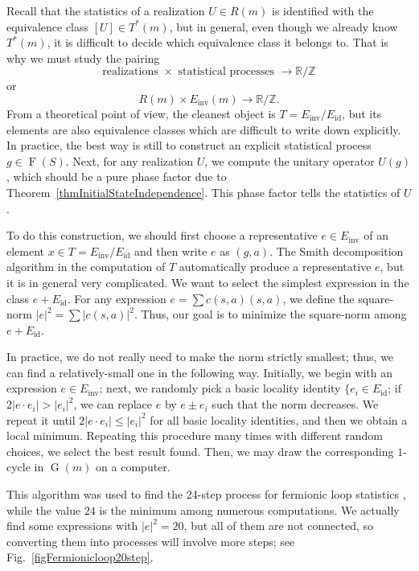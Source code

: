 \documentclass[reprint, amsmath, amssymb, showpacs, floatfix, longbibliography, aps, twocolumn, superscriptaddress, nofootinbib]{revtex4-2}
\newcommand{\ZZ}{{\mathbb Z}}
\newcommand{\RR}{{\mathbb R}}
\newcommand{\id}{{\operatorname{id}}}
\newcommand{\inv}{{\operatorname{inv}}}
\theoremstyle{definition}
\begin{document}
Recall that the statistics of a realization $U\in R(m)$ is identified with the equivalence class $[U]\in T^*(m)$, but in general, even though we already know $T^*(m)$, it is difficult to decide which equivalence class it belongs to. That is why we must study the pairing
\begin{equation*}
	\text{realizations }\times \text{ statistical processes }\rightarrow \RR/\ZZ
\end{equation*}
or
\begin{equation}
	R(m)\times E_{\inv}(m)\rightarrow \RR/\ZZ.
\end{equation}
From a theoretical point of view, the cleanest object is $T=E_\inv/E_\id$, but its elements are also equivalence classes which are difficult to write down explicitly. In practice, the best way is still to construct an explicit statistical process $g\in \operatorname{F}(S)$. Next, for any realization $U$, we compute the unitary operator $U(g)$, which should be a pure phase factor due to Theorem~\ref{thmInitialStateIndependence}. This phase factor tells the statistics of $U$.

To do this construction, we should first choose a representative $e\in E_\inv$ of an element $x\in T=E_\inv/E_\id$ and then write $e$ as $(g,a)$. The Smith decomposition algorithm in the computation of $T$ automatically produce a representative $e$, but it is in general very complicated. We want to select the simplest expression in the class $e+E_\id$. For any expression $e=\sum c(s,a)(s,a)$, we define the square-norm $|e|^2=\sum |c(s,a)|^2$. Thus, our goal is to minimize the square-norm among $e+E_\id$.
 
In practice, we do not really need to make the norm strictly smallest; thus, we can find a relatively-small one in the following way. Initially, we begin with an expression $e\in E_\inv$; next, we randomly pick a basic locality identity $\{e_i\in E_{\operatorname{id}}$; if $2|e\cdot e_i|> |e_i|^2$, we can replace $e$ by $e\pm e_i$ such that the norm decreases. We repeat it until $2|e\cdot e_i|\le  |e_i|^2$ for all basic locality identities, and then we obtain a local minimum. Repeating this procedure many times with different random choices, we select the best result found. Then, we may draw the corresponding $1$-cycle in $\operatorname{G}(m)$ on a computer.

This algorithm was used to find the 24-step process for fermionic loop statistics \cite{Previous}, while the value $24$ is the minimum among numerous computations. We actually find some expressions with $|e|^2=20$, but all of them are not connected, so converting them into processes will involve more steps; see Fig.~\ref{figFermionicloop20step}.
 
\end{document}
